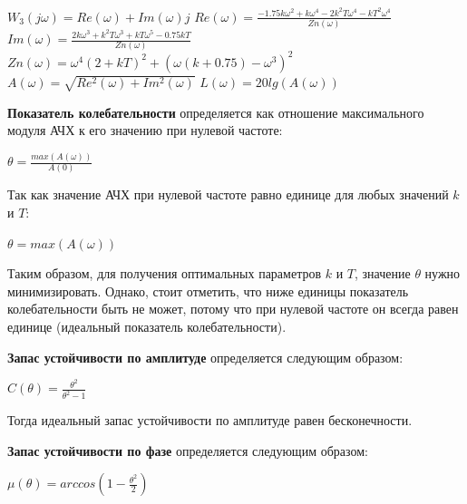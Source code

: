 \documentclass[14pt,a4paper,report]{report}
\begin{document}
	\begin{center}
		$W_3(j\omega)=Re(\omega)+Im(\omega)j$  \linebreak \linebreak
		$Re(\omega)=\frac{-1.75k\omega^2+k\omega^4-2k^2T\omega^4-kT^2\omega^4}{Zn(\omega)}$ \linebreak \linebreak
		$Im(\omega)=\frac{2k\omega^3+k^2T\omega^3+kT\omega^5-0.75kT}{Zn(\omega)}$ \linebreak \linebreak
		$Zn(\omega)=\omega^4(2+kT)^2+(\omega(k+0.75)-\omega^3)^2$ \linebreak \linebreak
		$A(\omega)=\sqrt{Re^2(\omega)+Im^2(\omega)}$ \linebreak \linebreak
		$L(\omega)=20lg(A(\omega))$
	\end{center}
	
	\textbf{Показатель колебательности} определяется как отношение максимального модуля АЧХ к его значению при нулевой частоте:
	
	\begin{center}
		$\theta=\frac{max(A(\omega))}{A(0)}$
	\end{center}
	
	Так как значение АЧХ при нулевой частоте равно единице для любых значений $k$ и $T$:
	
	\begin{center}
		$\theta=max(A(\omega))$
	\end{center}
	
	Таким образом, для получения оптимальных параметров $k$ и $T$, значение $\theta$ нужно минимизировать. Однако, стоит отметить, что ниже единицы показатель колебательности быть не может, потому что при нулевой частоте он всегда равен единице (идеальный показатель колебательности).
	
	\textbf{Запас устойчивости по амплитуде} определяется следующим образом:
	
	\begin{center}
		$C(\theta)=\frac{\theta^2}{\theta^2-1}$
	\end{center}
	
	Тогда идеальный запас устойчивости по амплитуде равен бесконечности.
	
	\textbf{Запас устойчивости по фазе} определяется следующим образом:
	
	\begin{center}
		$\mu(\theta)=arccos(1-\frac{\theta^2}{2})$
	\end{center}
	
\end{document}
